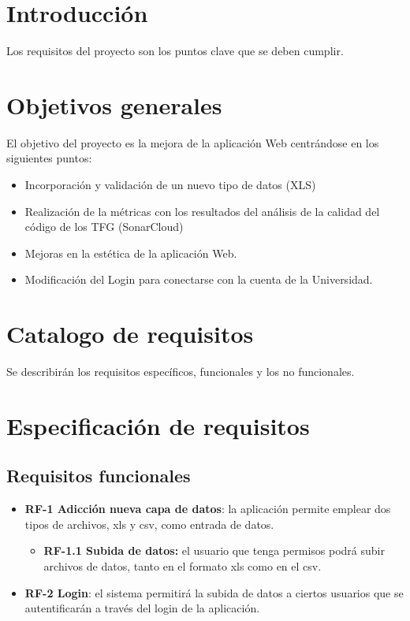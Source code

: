 
\section{Introducción}
Los requisitos\cite{requisitos} del proyecto son los puntos clave que se deben cumplir.

\section{Objetivos generales}
El objetivo del proyecto es la mejora de la aplicación Web centrándose en los siguientes puntos:
\begin{itemize}
	\item Incorporación y validación de un nuevo tipo de datos (XLS)
	\item Realización de la métricas con los resultados del análisis de la calidad del código de los TFG (SonarCloud)
	\item Mejoras en la estética de la aplicación Web.
	\item Modificación del Login para conectarse con la cuenta de la Universidad.
\end{itemize}

\section{Catalogo de requisitos}
Se describirán los requisitos específicos, funcionales y los no funcionales.
\section{Especificación de requisitos}

\subsection{Requisitos funcionales}
\begin{itemize}
	
	\item \textbf{RF-1 Adicción nueva capa de datos}: la aplicación permite emplear dos tipos de archivos, xls y csv, como entrada de datos.
	\begin{itemize}
		\item \textbf{RF-1.1 Subida de datos:} el usuario que tenga permisos podrá subir archivos de datos, tanto en el formato xls como en el csv. 
	\end{itemize}
	
	\item \textbf{RF-2 Login}: el sistema permitirá la subida de datos a ciertos usuarios que se autentificarán a  través del login de la aplicación.
\end{itemize}

